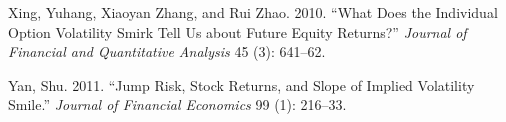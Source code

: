\documentclass[
  letterpaper,
  DIV=11,
  numbers=noendperiod]{scrreprt}
\newlength{\cslhangindent}
\newlength{\cslentryspacingunit} %
\newenvironment{CSLReferences}[2] %
 {%
  \setlength{\parindent}{0pt}
  \ifodd #1
  \let\oldpar\par
  \def\par{\hangindent=\cslhangindent\oldpar}
  \fi
  \setlength{\parskip}{#2\cslentryspacingunit}
 }%
 {}
\begin{document}
\begin{CSLReferences}{1}{0}
\leavevmode{}%
Xing, Yuhang, Xiaoyan Zhang, and Rui Zhao. 2010. {``What Does the
Individual Option Volatility Smirk Tell Us about Future Equity
Returns?''} \emph{Journal of Financial and Quantitative Analysis} 45
(3): 641--62.

\leavevmode{}%
Yan, Shu. 2011. {``Jump Risk, Stock Returns, and Slope of Implied
Volatility Smile.''} \emph{Journal of Financial Economics} 99 (1):
216--33.

\end{CSLReferences}
\end{document}
